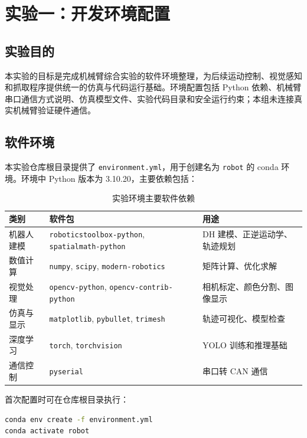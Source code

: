 \section{实验一：开发环境配置}

\subsection{实验目的}

本实验的目标是完成机械臂综合实验的软件环境整理，为后续运动控制、视觉感知和抓取程序提供统一的仿真与代码运行基础。环境配置包括 Python 依赖、机械臂串口通信方式说明、仿真模型文件、实验代码目录和安全运行约束；本组未连接真实机械臂验证硬件通信。

\subsection{软件环境}

本实验仓库根目录提供了 \texttt{environment.yml}，用于创建名为 \texttt{robot} 的 conda 环境。环境中 Python 版本为 3.10.20，主要依赖包括：

\begin{table}[H]
  \centering
  \caption{实验环境主要软件依赖}
  \small
  \begin{tabularx}{\textwidth}{L{2.3cm}Y Y}
    \toprule
    类别 & 软件包 & 用途 \\
    \midrule
    机器人建模 & \texttt{roboticstoolbox-python}, \texttt{spatialmath-python} & DH 建模、正逆运动学、轨迹规划 \\
    数值计算 & \texttt{numpy}, \texttt{scipy}, \texttt{modern-robotics} & 矩阵计算、优化求解 \\
    视觉处理 & \texttt{opencv-python}, \texttt{opencv-contrib-python} & 相机标定、颜色分割、图像显示 \\
    仿真与显示 & \texttt{matplotlib}, \texttt{pybullet}, \texttt{trimesh} & 轨迹可视化、模型检查 \\
    深度学习 & \texttt{torch}, \texttt{torchvision} & YOLO 训练和推理基础 \\
    通信控制 & \texttt{pyserial} & 串口转 CAN 通信 \\
    \bottomrule
  \end{tabularx}
\end{table}

首次配置时可在仓库根目录执行：

\begin{lstlisting}[language=bash,caption={conda 环境创建命令}]
conda env create -f environment.yml
conda activate robot
\end{lstlisting}

